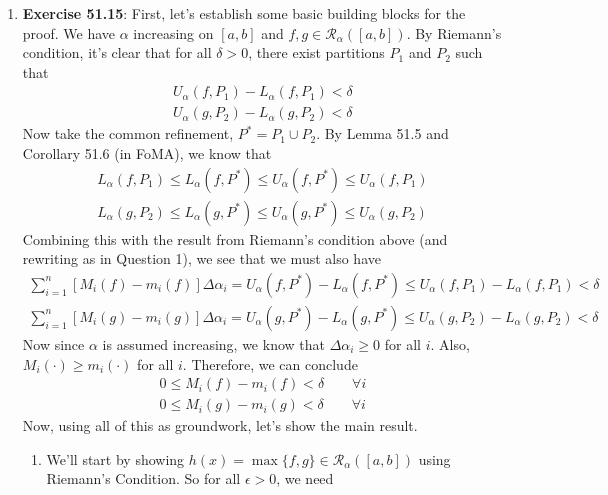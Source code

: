 \documentclass[12pt]{article}
\theoremstyle{plain}
\theoremstyle{definition}
\theoremstyle{remark}
\begin{document}
\begin{enumerate}
\item \textbf{Exercise 51.15}: First, let's establish some
    basic building blocks for the proof. 
    We have $\alpha$ increasing on
    $[a,b]$ and $f,g \in \mathscr{R}_\alpha([a,b])$. By
    Riemann's condition, it's clear that for all $\delta>0$,
    there exist partitions $P_1$ and $P_2$ such that 
    \begin{align}
        U_\alpha(f,P_1) - L_\alpha(f,P_1) < \delta 
            \label{q2p1} \\
        U_\alpha(g,P_2) - L_\alpha(g,P_2) < \delta 
            \label{q2p2} 
    \end{align}
    Now take the common refinement, $P^* = P_1 \cup P_2$.
    By Lemma 51.5 and Corollary 51.6 (in FoMA), we know
    that 
    \begin{align*}
         L_\alpha(f,P_1) \leq L_\alpha(f,P^*) \leq
            U_\alpha(f,P^*) \leq U_\alpha(f,P_1) \\
         L_\alpha(g,P_2) \leq L_\alpha(g,P^*) \leq
            U_\alpha(g,P^*) \leq U_\alpha(g,P_2) 
    \end{align*}
    Combining this with the result from Riemann's condition
    above (and rewriting as in Question 1), 
    we see that we must also have
    \begin{align*}
        \sum^n_{i=1} [M_i(f) - m_i(f)] \Delta\alpha_i =
        U_\alpha(f,P^*) - L_\alpha(f,P^*) \leq
        U_\alpha(f,P_1) - L_\alpha(f,P_1) < \delta \\
        \sum^n_{i=1} [M_i(g) - m_i(g)] \Delta\alpha_i =
        U_\alpha(g,P^*) - L_\alpha(g,P^*) \leq
        U_\alpha(g,P_2) - L_\alpha(g,P_2) < \delta 
    \end{align*}
    Now since $\alpha$ is assumed increasing, we know
    that $\Delta\alpha_i \geq 0$ for all $i$. Also,
    $M_i(\cdot) \geq m_i(\cdot)$ 
    for all $i$. Therefore, we can conclude
    \begin{align}
        0 \leq M_i(f) - m_i(f) < \delta \qquad
        \forall i \label{ems1} \\
        0 \leq M_i(g) - m_i(g) < \delta \qquad
        \forall i \label{ems2} 
    \end{align}
    Now, using all of this as groundwork, let's show the main
    result.
    \newpage
    \begin{enumerate}
        \item We'll start by showing $h(x) = \max \{f, g\} \in
            \mathscr{R}_\alpha([a,b])$ using 
            Riemann's Condition. So for all $\epsilon>0$, we need

\end{enumerate}
\end{enumerate}
\end{document}
